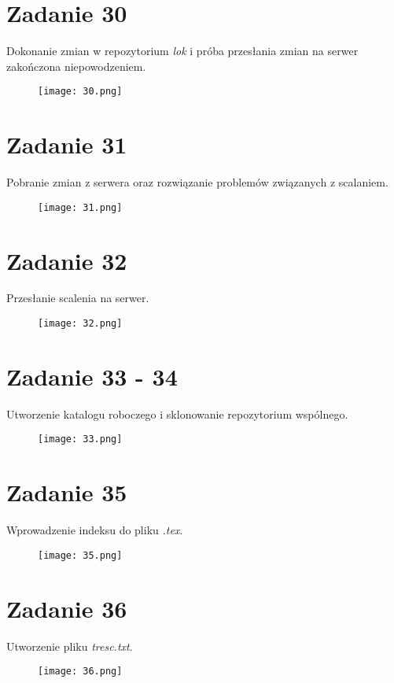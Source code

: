 \documentclass[fleqn,onecolumn,a4paper,12pt,titlepage]{article}
\begin{document}
\section*{Zadanie 30}
Dokonanie zmian w repozytorium \textit{lok} i próba przesłania zmian na serwer zakończona niepowodzeniem.
\begin{figure}[H]%
    \centering\texttt{[image: 30.png]}
\end{figure}

\section*{Zadanie 31}
Pobranie zmian z serwera oraz rozwiązanie problemów związanych z scalaniem.
\begin{figure}[H]%
    \centering\texttt{[image: 31.png]}
\end{figure}

\section*{Zadanie 32}
Przesłanie scalenia na serwer.
\begin{figure}[H]%
    \centering\texttt{[image: 32.png]}
\end{figure}

\section*{Zadanie 33 - 34}
Utworzenie katalogu roboczego i sklonowanie repozytorium wspólnego.
\begin{figure}[H]%
    \centering\texttt{[image: 33.png]}
\end{figure}

\section*{Zadanie 35}
Wprowadzenie indeksu do pliku \textit{.tex}.
\begin{figure}[H]%
    \centering\texttt{[image: 35.png]}
\end{figure}

\section*{Zadanie 36}
Utworzenie pliku \textit{tresc.txt}.
\begin{figure}[H]%
    \centering\texttt{[image: 36.png]}
\end{figure}
\end{document}
